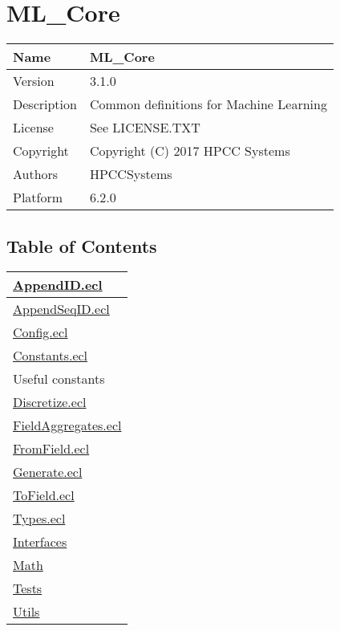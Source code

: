 \chapter*{ML\_Core}
\hypertarget{ecldoc:toc:ML_Core}{}

\begin{tabularx}{\textwidth}{|l|X|}
\hline
Name & ML\_Core \\
\hline
Version & 3.1.0 \\
\hline
Description & Common definitions for Machine Learning \\
\hline
License & See LICENSE.TXT \\
\hline
Copyright & Copyright (C) 2017 HPCC Systems \\
\hline
Authors & HPCCSystems \\
\hline
Platform & 6.2.0 \\
\hline
\end{tabularx}

\section*{Table of Contents}
{\renewcommand{\arraystretch}{1.5}
\begin{longtable}{|p{\textwidth}|}
\hline
\hyperlink{ecldoc:toc:ML_Core.AppendID}{AppendID.ecl} \\
\hline
\hyperlink{ecldoc:toc:ML_Core.AppendSeqID}{AppendSeqID.ecl} \\
\hline
\hyperlink{ecldoc:toc:ML_Core.Config}{Config.ecl} \\
\hline
\hyperlink{ecldoc:toc:ML_Core.Constants}{Constants.ecl} \\
Useful constants \\
\hline
\hyperlink{ecldoc:toc:ML_Core.Discretize}{Discretize.ecl} \\
\hline
\hyperlink{ecldoc:toc:ML_Core.FieldAggregates}{FieldAggregates.ecl} \\
\hline
\hyperlink{ecldoc:toc:ML_Core.FromField}{FromField.ecl} \\
\hline
\hyperlink{ecldoc:toc:ML_Core.Generate}{Generate.ecl} \\
\hline
\hyperlink{ecldoc:toc:ML_Core.ToField}{ToField.ecl} \\
\hline
\hyperlink{ecldoc:toc:ML_Core.Types}{Types.ecl} \\
\hline
\hyperlink{ecldoc:toc:ML_Core/Interfaces}{Interfaces} \\
\hline
\hyperlink{ecldoc:toc:ML_Core/Math}{Math} \\
\hline
\hyperlink{ecldoc:toc:ML_Core/Tests}{Tests} \\
\hline
\hyperlink{ecldoc:toc:ML_Core/Utils}{Utils} \\
\hline
\end{longtable}
}















